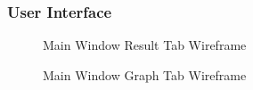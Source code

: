 \documentclass[12pt,a4paper]{article}
\begin{document}
\subsubsection{User Interface}
\begin{figure}[H]
\caption{Main Window Result Tab Wireframe}
\label{mainwf}
\end{figure}
\begin{figure}[H]
\caption{Main Window Graph Tab Wireframe}
\label{graphwf}
\end{figure}
\end{document}
